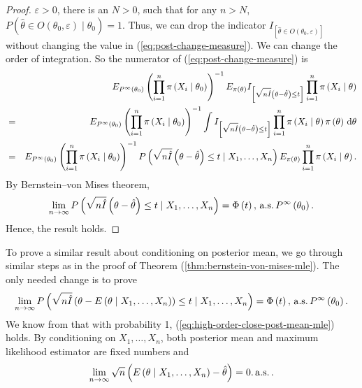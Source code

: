 \begin{proof}
$\varepsilon>0$, there is an $N>0$, such that for any $n>N$, $P\left(\hat{\theta}\in O\left(\theta_{0},\varepsilon\right)\mid\theta_{0}\right)=1$.
Thus, we can drop the indicator $I_{\left[\hat{\theta}\in O\left(\theta_{0},\varepsilon\right)\right]}$
without changing the value in (\ref{eq:post-change-measure}). We
can change the order of integration. So the numerator of (\ref{eq:post-change-measure})
is 
\begin{eqnarray*}
 &  & E_{P^{\infty}\left(\theta_{0}\right)}\left(\prod_{i=1}^{n}\pi\left(X_{i}\mid\theta_{0}\right)\right)^{-1}E_{\pi\left(\theta\right)}I_{\left[\sqrt{n\hat{I}}\left(\theta-\hat{\theta}\right)\le t\right]}\prod_{i=1}^{n}\pi\left(X_{i}\mid\theta\right)\\
 & = & E_{P^{\infty}\left(\theta_{0}\right)}\left(\prod_{i=1}^{n}\pi\left(X_{i}\mid\theta_{0}\right)\right)^{-1}\int I_{\left[\sqrt{n\hat{I}}\left(\theta-\hat{\theta}\right)\le t\right]}\prod_{i=1}^{n}\pi\left(X_{i}\mid\theta\right)\pi\left(\theta\right)\,\mathrm{d}\theta\\
 & = & E_{P^{\infty}\left(\theta_{0}\right)}\left(\prod_{i=1}^{n}\pi\left(X_{i}\mid\theta_{0}\right)\right)^{-1}P\left(\sqrt{n\hat{I}}\left(\theta-\hat{\theta}\right)\le t\mid X_{1},\ldots,X_{n}\right)E_{\pi\left(\theta\right)}\prod_{i=1}^{n}\pi\left(X_{i}\mid\theta\right).
\end{eqnarray*}
By Bernstein--von Mises theorem, 
\[
\lim_{n\rightarrow\infty}P\left(\sqrt{n\hat{I}}\left(\theta-\hat{\theta}\right)\le t\mid X_{1},\ldots,X_{n}\right)=\Phi\left(t\right),\,\mathrm{a.s.}\, P^{\infty}\left(\theta_{0}\right).
\]
Hence, the result holds.
\end{proof}
To prove a similar result about conditioning on posterior mean, we
go through similar steps as in the proof of Theorem (\ref{thm:bernstein-von-mises-mle}).
The only needed change is to prove 
\[
\lim_{n\rightarrow\infty}P\left(\sqrt{n\hat{I}}\left(\theta-E\left(\theta\mid X_{1},\ldots,X_{n}\right)\right)\le t\mid X_{1},\ldots,X_{n}\right)=\Phi\left(t\right),\,\mathrm{a.s.}\, P^{\infty}\left(\theta_{0}\right).
\]
We know from \citet{ghosh2011moment} that with probability 1, (\ref{eq:high-order-close-post-mean-mle})
holds. By conditioning on $X_{1},\ldots,X_{n}$, both posterior mean
and maximum likelihood estimator are fixed numbers and 
\[
\lim_{n\rightarrow\infty}\sqrt{n}\left(E\left(\theta\mid X_{1},\ldots,X_{n}\right)-\hat{\theta}\right)=0.\,\mathrm{a.s.}\,.
\]
